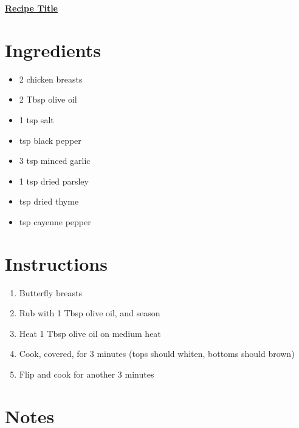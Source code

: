 \documentclass[11pt]{article}
\begin{document}
	\begin{center}\begin{huge}\underline{\textbf{Recipe Title}}\end{huge}\end{center}

	\section*{Ingredients}
	\begin{itemize}
		\item 2 chicken breasts
		\item 2 Tbsp olive oil
		\item 1 tsp salt
		\item {} tsp black pepper
		\item 3 tsp minced garlic
		\item 1 tsp dried parsley
		\item {} tsp dried thyme
		\item {} tsp cayenne pepper
	\end{itemize}
	
	\section*{Instructions}
	\begin{enumerate}
		\item Butterfly breasts
		\item Rub with 1 Tbsp olive oil, and season
		\item Heat 1 Tbsp olive oil on medium heat
		\item Cook, covered, for 3 minutes (tops should whiten, bottoms should brown)
		\item Flip and cook for another 3 minutes
	\end{enumerate}
	
	\section*{Notes}
	
\end{document}

